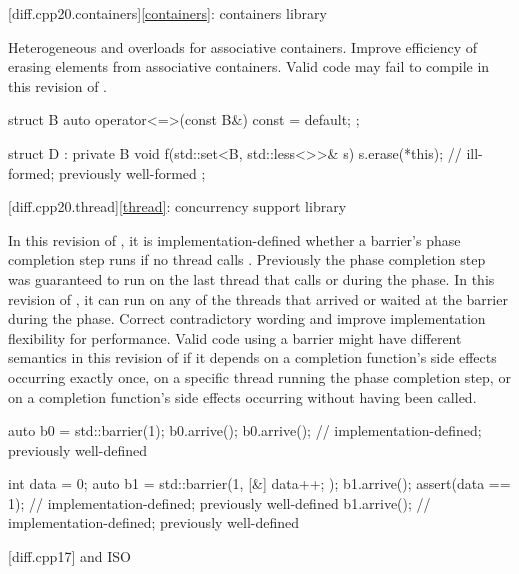 [diff.cpp20.containers]{\ref*{containers}: containers library}

\change
Heterogeneous  and  overloads
for associative containers.
\rationale
Improve efficiency of erasing elements from associative containers.
\effect
Valid \CppXX{} code may fail to compile in this revision of \Cpp{}.
\begin{example}
\begin{codeblock}
struct B {
  auto operator<=>(const B&) const = default;
};

struct D : private B {
  void f(std::set<B, std::less<>>& s) {
    s.erase(*this);             // ill-formed; previously well-formed
  }
};
\end{codeblock}
\end{example}

[diff.cpp20.thread]{\ref*{thread}: concurrency support library}

\change
In this revision of \Cpp{},
it is implementation-defined whether a barrier's phase completion step runs
if no thread calls .
Previously the phase completion step was guaranteed to run on the last thread that calls  or  during the phase.
In this revision of \Cpp{},
it can run on any of the threads that arrived or waited at the barrier
during the phase.
\rationale
Correct contradictory wording and
improve implementation flexibility for performance.
\effect
Valid \CppXX{} code using a barrier might have
different semantics in this revision of \Cpp{}
if it depends on a completion function's side effects occurring exactly once,
on a specific thread running the phase completion step, or
on a completion function's side effects occurring
without  having been called.
\begin{example}
\begin{codeblock}
auto b0 = std::barrier(1);
b0.arrive();
b0.arrive();            // implementation-defined; previously well-defined

int data = 0;
auto b1 = std::barrier(1, [&] { data++; });
b1.arrive();
assert(data == 1);      // implementation-defined; previously well-defined
b1.arrive();            // implementation-defined; previously well-defined
\end{codeblock}
\end{example}

[diff.cpp17]{\Cpp{} and ISO \CppXVII{}}

